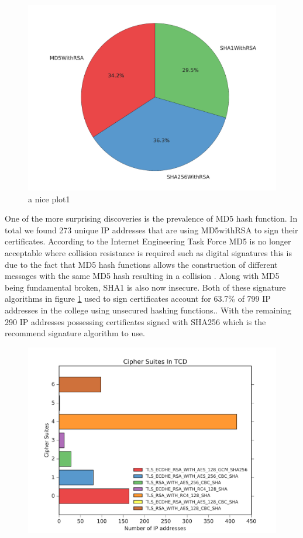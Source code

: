 \documentclass[a4wide,leqno,12pt]{report}
\begin{document}
\begin{figure}[h!]
\includegraphics[scale=.5]{pdf_images/signatureAlgorithms}
\caption{a nice plot1}
\label{fig:signatureAlgorithms}
\end{figure}

One of the more surprising discoveries is the prevalence of MD5 hash function. In total we found 273 unique IP addresses that are using MD5withRSA to sign their certificates. According to the Internet Engineering Task Force MD5 is no longer acceptable where collision resistance is required
such as digital signatures \cite{turner2011updated} this is due to the fact that MD5 hash functions allows the construction of different messages with the same MD5 hash resulting in a collision \cite{md5}. Along with MD5 being fundamental broken, SHA1 is also now insecure. Both of these signature algorithms in figure \ref{fig:signatureAlgorithms} used to sign certificates account for 63.7\% of 799 IP addresses in the college using unsecured hashing functions.\cite{ssllabs}. With the remaining 290 IP addresses possessing certificates signed with SHA256 which is the recommend signature algorithm to use\cite{ssllabs}.

\begin{figure}[h!]
\includegraphics[scale=.5]{pdf_images/CipherSuitesInTCD}
\end{figure}
\end{document}
